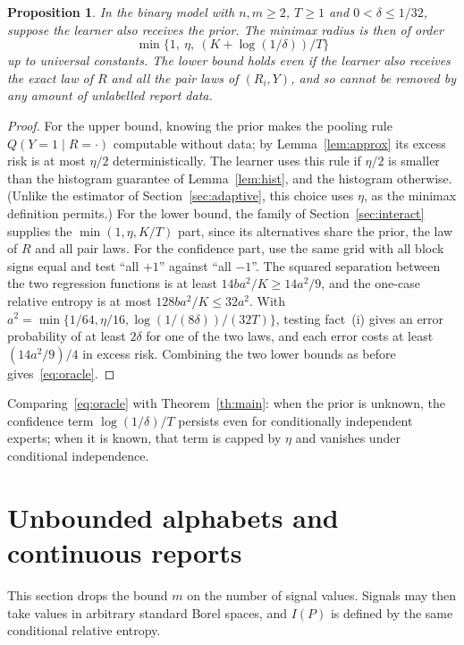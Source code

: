 \documentclass[11pt,a4paper]{article}
\newtheorem{proposition}[theorem]{Proposition}
\theoremstyle{remark}
\begin{document}
\begin{proposition}\label{prop:oracle}
In the binary model with $n,m\ge2$, $T\ge1$ and $0<\delta\le1/32$, suppose the learner also receives the prior. The minimax radius is then of order
\begin{equation}\label{eq:oracle}
 \min\{1,\ \eta,\ (K+\log(1/\delta))/T\}
\end{equation}
up to universal constants. The lower bound holds even if the learner also receives the exact law of $R$ and all the pair laws of $(R_i,Y)$, and so cannot be removed by any amount of unlabelled report data.
\end{proposition}
\begin{proof}
For the upper bound, knowing the prior makes the pooling rule $Q(Y=1\mid R=\cdot)$ computable without data; by Lemma~\ref{lem:approx} its excess risk is at most $\eta/2$ deterministically. The learner uses this rule if $\eta/2$ is smaller than the histogram guarantee of Lemma~\ref{lem:hist}, and the histogram otherwise. (Unlike the estimator of Section~\ref{sec:adaptive}, this choice uses $\eta$, as the minimax definition permits.) For the lower bound, the family of Section~\ref{sec:interact} supplies the $\min(1,\eta,K/T)$ part, since its alternatives share the prior, the law of $R$ and all pair laws. For the confidence part, use the same grid with all block signs equal and test ``all $+1$'' against ``all $-1$''. The squared separation between the two regression functions is at least $14ba^2/K\ge14a^2/9$, and the one-case relative entropy is at most $128ba^2/K\le32a^2$. With $a^2=\min\{1/64,\eta/16,\log(1/(8\delta))/(32T)\}$, testing fact~(i) gives an error probability of at least $2\delta$ for one of the two laws, and each error costs at least $(14a^2/9)/4$ in excess risk. Combining the two lower bounds as before gives~\eqref{eq:oracle}.
\end{proof}
Comparing~\eqref{eq:oracle} with Theorem~\ref{th:main}: when the prior is unknown, the confidence term $\log(1/\delta)/T$ persists even for conditionally independent experts; when it is known, that term is capped by $\eta$ and vanishes under conditional independence.

\section{Unbounded alphabets and continuous reports}\label{sec:cont}
This section drops the bound $m$ on the number of signal values. Signals may then take values in arbitrary standard Borel spaces, and $I(P)$ is defined by the same conditional relative entropy.
\end{document}
